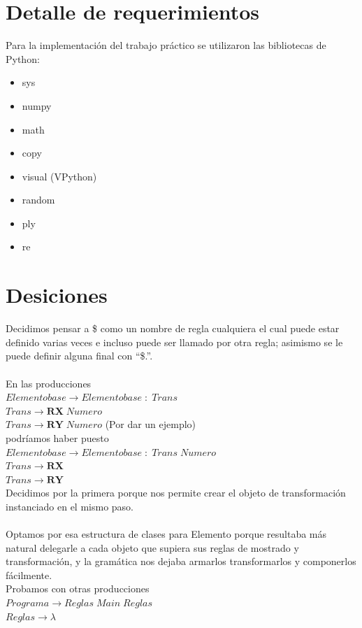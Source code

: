 \documentclass[10pt,a4paper]{article}
\begin{document}
\section{Detalle de requerimientos}
	Para la implementación del trabajo práctico se utilizaron las bibliotecas de Python:
\begin{itemize}
\item sys
\item numpy
\item math
\item copy 
\item visual (VPython)
\item random
\item ply
\item re
\end{itemize}
\section{Desiciones}
Decidimos pensar a \$ como un nombre de regla cualquiera el cual puede estar definido varias veces e incluso puede ser llamado por otra regla; asimismo se le puede definir alguna final con ``\$.''.\\
\\
En las producciones \\
$Elementobase\rightarrow{}Elementobase\;:\;Trans$\\
$Trans\rightarrow{}\textbf{RX}\;Numero$ \\
$Trans\rightarrow{}\textbf{RY}\;Numero$ (Por dar un ejemplo)\\
podríamos haber puesto \\
$Elementobase\rightarrow{}Elementobase\;:\;Trans\;Numero$\\
$Trans\rightarrow{}\textbf{RX}$\\
$Trans\rightarrow{}\textbf{RY}$\\
Decidimos por la primera porque nos permite crear el objeto de transformación instanciado en el mismo paso.\\
\\
Optamos por esa estructura de clases para Elemento porque resultaba más natural delegarle a cada objeto que supiera sus reglas de mostrado y transformación, y la gramática nos dejaba armarlos transformarlos y componerlos fácilmente.
\\
Probamos con otras producciones \\
$Programa\rightarrow{}Reglas\;Main\;Reglas$\\
$Reglas\rightarrow{}\lambda$\\
\end{document}
